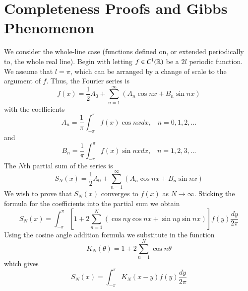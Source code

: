 \documentclass[12pt, a4paper, oneside, openright, titlepage]{book}
\begin{document}
\section{Completeness Proofs and Gibbs Phenomenon}


We consider the whole-line case (functions defined on, or extended periodically to, the whole real line). Begin with letting $f \in C^1(\mathbb R)$ be a $2l$ periodic function. We assume that $l = \pi$, which can be arranged by a change of scale to the argument of $f$. Thus, the Fourier series is \begin{equation*}
    f(x) = \frac{1}{2}A_0 + \sum_{n=1}^{\infty}(A_n\cos nx+B_n\sin nx)
\end{equation*}
with the coefficients \begin{equation*}
    A_n = \frac{1}{\pi}\int_{-\pi}^{\pi}f(x)\cos nxdx,\;\;\;n=0,1,2,...
\end{equation*}
and \begin{equation*}
    B_n = \frac{1}{\pi}\int_{-\pi}^{\pi}f(x)\sin nxdx,\;\;\;n=1,2,3,...
\end{equation*}
The $N$th partial sum of the series is \begin{equation*}
    S_N(x) = \frac{1}{2}A_0 + \sum_{n=1}^{\infty}(A_n\cos nx+B_n\sin nx)
\end{equation*}
We wish to prove that $S_N(x)$ converges to $f(x)$ as $N\rightarrow \infty$. Sticking the formula for the coefficients into the partial sum we obtain \begin{equation*}
    S_N(x)=\int_{-\pi}^{\pi}\left[1+2\sum_{n=1}^N(\cos ny\cos nx + \sin ny\sin nx)\right]f(y)\frac{dy}{2\pi}
\end{equation*}
Using the cosine angle addition formula we substitute in the function \begin{equation*}
    K_N(\theta) = 1+2\sum_{n=1}^N\cos n\theta
\end{equation*}
which gives \begin{equation*}
    S_N(x) = \int_{-\pi}^{\pi}K_N(x-y)f(y)\frac{dy}{2\pi}
\end{equation*}
\end{document}
